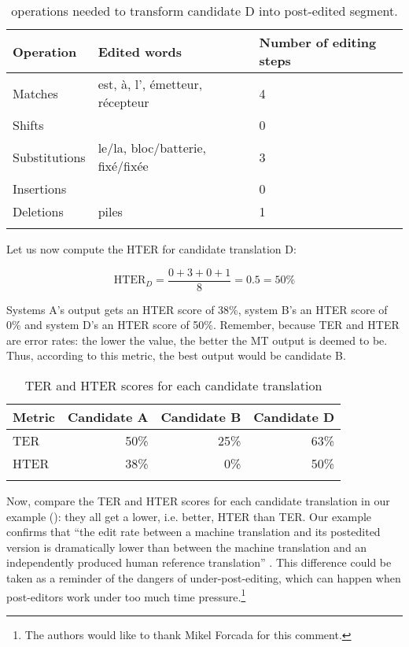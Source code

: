 \documentclass[output=paper]{langscibook}
\begin{document}
\begin{table}[H]
\begin{tabularx}{\textwidth}{llY}
\lsptoprule
{Operation} & {Edited words} & {Number of editing steps}\\
\midrule
Matches & est, à, l’, émetteur, récepteur & 4\\
Shifts &  & 0\\
Substitutions & le/la, bloc/batterie, fixé/fixée & 3\\
Insertions &  & 0\\
Deletions & piles & 1\\
\lspbottomrule
\end{tabularx}
\caption{operations needed to transform candidate D into post-edited segment.}
\label{tab:rossi:10}
\end{table}

Let us now compute the HTER for candidate translation D:

\begin{equation}
\text{HTER}_D=\frac{0+3+0+1} 8=0.5=50\%
\end{equation}

Systems A’s output gets an HTER score of 38\%, system B’s an HTER score of 0\% and system D’s an HTER score of 50\%. Remember, because TER and HTER are error rates: the lower the value, the better the MT output is deemed to be. Thus, according to this metric, the best output would be candidate B.

\begin{table}
\begin{tabular}{lrrr}
\lsptoprule
{Metric} & \multicolumn{1}{c}{Candidate A} & \multicolumn{1}{c}{Candidate B} & \multicolumn{1}{c}{Candidate D}\\
\midrule
TER & 50\% & 25\% & 63\%\\
HTER & 38\% & 0\% & 50\%\\
\lspbottomrule
\end{tabular}
\caption{\label{bkm:Ref69688808}\label{tab:rossi:11}TER and HTER scores for each candidate translation}
\end{table}

Now, compare the TER and HTER scores for each candidate translation in our example (): they all get a lower, i.e. better, HTER than TER. Our example confirms that “the edit rate between a machine translation and its postedited version is dramatically lower than between the machine translation and an independently produced human reference translation” \citep[52]{Koehn2020}. This difference could be taken as a reminder of the dangers of under-post-editing, which can happen when post-editors work under too much time pressure.\footnote{The authors would like to thank Mikel Forcada for this comment.}
\end{document}
